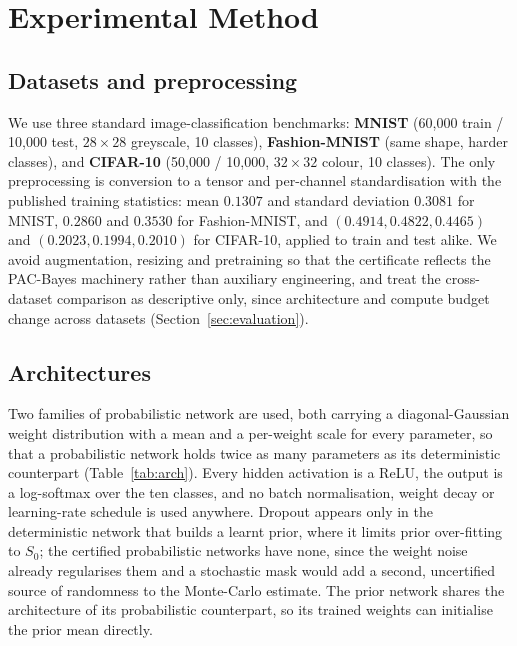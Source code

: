 \section{Experimental Method}\label{sec:method}

\subsection{Datasets and preprocessing}\label{sec:datasets}

We use three standard image-classification benchmarks: \textbf{MNIST}
\parencite{lecun1998} (60{,}000 train / 10{,}000 test, $28\times28$ greyscale, 10
classes), \textbf{Fashion-MNIST} \parencite{xiao2017} (same shape, harder
classes), and \textbf{CIFAR-10} \parencite{krizhevsky2009} (50{,}000 / 10{,}000,
$32\times32$ colour, 10 classes). The only preprocessing is conversion to a
tensor and per-channel standardisation with the published training statistics:
mean $0.1307$ and standard deviation $0.3081$ for MNIST, $0.2860$ and
$0.3530$ for Fashion-MNIST, and $(0.4914,0.4822,0.4465)$ and
$(0.2023,0.1994,0.2010)$ for CIFAR-10, applied to train and test alike. We
avoid augmentation, resizing and pretraining so that the certificate reflects
the PAC-Bayes machinery rather than auxiliary engineering, and treat the
cross-dataset comparison as descriptive only, since architecture and compute
budget change across datasets (Section~\ref{sec:evaluation}).

\subsection{Architectures}\label{sec:arch}

Two families of probabilistic network are used, both carrying a diagonal-Gaussian
weight distribution with a mean and a per-weight scale for every parameter, so
that a probabilistic network holds twice as many parameters as its deterministic
counterpart (Table~\ref{tab:arch}). Every hidden activation is a ReLU, the output
is a log-softmax over the ten classes, and no batch normalisation, weight decay or
learning-rate schedule is used anywhere. Dropout appears only in the deterministic
network that builds a learnt prior, where it limits prior over-fitting to $S_0$;
the certified probabilistic networks have none, since the weight noise already
regularises them and a stochastic mask would add a second, uncertified source of
randomness to the Monte-Carlo estimate. The prior network shares the architecture
of its probabilistic counterpart, so its trained weights can initialise the prior
mean directly.

